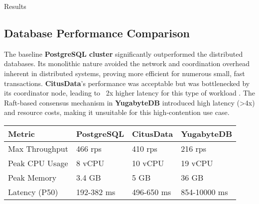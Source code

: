 \documentclass[a0,landscape]{config/poster/a0poster}
\newcommand{\postersection}[1]{%
  \begin{tcolorbox}[
    colback=IEEEblue,
    colframe=IEEEblue,
    fonttitle=\bfseries,
    coltext=white,
    sharp corners,
    boxrule=0pt,
    top=4pt,
    bottom=4pt,
    halign=center
  ]
    \large #1
  \end{tcolorbox}%
}
\begin{document}
\begin{multicols}{4}

    \postersection{Results}
    \subsection*{Database Performance Comparison}
    The baseline \textbf{PostgreSQL cluster} significantly outperformed the distributed databases. Its monolithic nature avoided the network and coordination overhead inherent in distributed systems, proving more efficient for numerous small, fast transactions. \textbf{CitusData}'s performance was acceptable but was bottlenecked by its coordinator node, leading to ~2x higher latency for this type of workload \cite{Slot2020}. The Raft-based consensus mechanism in \textbf{YugabyteDB} introduced high latency (\textgreater4x) and resource costs, making it unsuitable for this high-contention use case.

    \begin{center}\vspace{0.5cm}
        \begin{tabular}{l l l l}
            \toprule
            \textbf{Metric} & \textbf{PostgreSQL} & \textbf{CitusData} & \textbf{YugabyteDB} \\
            \midrule
            Max Throughput  & 466 rps             & 410 rps            & 216 rps             \\
            Peak CPU Usage  & 8 vCPU              & 10 vCPU            & 19 vCPU             \\
            Peak Memory     & 3.4 GB              & 5 GB               & 36 GB               \\
            Latency (P50)   & 192-382 ms          & 496-650 ms         & 854-10000 ms        \\
            \bottomrule
        \end{tabular}
    \end{center}\vspace{0.5cm}


\end{multicols}
\end{document}
